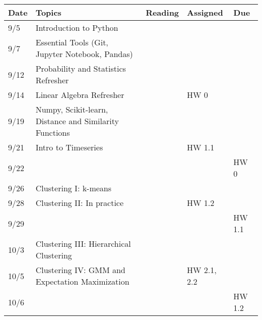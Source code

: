 \documentclass[11pt]{article}
\begin{document}
\small
\begin{centering}
\begin{tabular}{||l|p{3in}|l|l|l||}
\hline\hline
Date & Topics  & Reading & Assigned & Due  \\
\hline\hline
9/5 & Introduction to Python &  &  & \\
9/7 & Essential Tools (Git, Jupyter Notebook, Pandas) & & & \\

\hline
9/12 & Probability and Statistics Refresher & &  & \\
9/14 & Linear Algebra Refresher & & HW 0 & \\
\hline
 9/19 & Numpy, Scikit-learn, Distance and Similarity Functions & &  & \\
9/21 & Intro to Timeseries & & HW 1.1& \\ 
9/22 & & & &  HW 0\\
\hline

9/26 & Clustering I: k-means & & & \\
9/28 & Clustering II: In practice & &HW 1.2  & \\ 
9/29 &&&& HW 1.1 \\
\hline

10/3 & Clustering III: Hierarchical Clustering & & & \\  
10/5 & Clustering IV: GMM and Expectation Maximization& & HW 2.1, 2.2 & \\ 
10/6 &&&& HW 1.2 \\
\hline


\end{tabular}
\end{centering}
\end{document}
